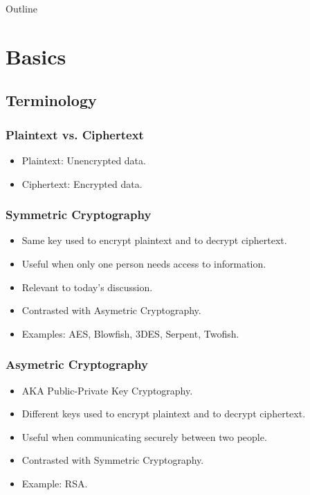 \documentclass[xcolor={dvipsnames,svgnames},hyperref=dvips]{beamer}
\title[Full-Disk Encryption]{}
\author{Wade Cline}
\date{04 March 2014}
\begin{document}
\begin{frame}
  \titlepage
\end{frame}

\begin{frame}{Outline}
  \tableofcontents
\end{frame}

\section{Basics}\label{section:basics}
	\subsection{Terminology}
	\begin{frame}
		\frametitle{Plaintext vs. Ciphertext}
		\begin{itemize}
		\item Plaintext: Unencrypted data.
		\item Ciphertext: Encrypted data.
		\end{itemize}
	\end{frame}

	\begin{frame}
		\frametitle{Symmetric Cryptography}
		\begin{itemize}
		\item Same key used to encrypt plaintext and to decrypt ciphertext. 
		\item Useful when only one person needs access to information.
		\item Relevant to today's discussion.
		\item Contrasted with Asymetric Cryptography.
		\item Examples: AES, Blowfish, 3DES, Serpent, Twofish.
		\end{itemize}
	\end{frame}

	\begin{frame}
		\frametitle{Asymetric Cryptography}
		\begin{itemize}
		\item AKA Public-Private Key Cryptography.
		\item Different keys used to encrypt plaintext and to decrypt ciphertext.
		\item Useful when communicating securely between two people.
		\item Contrasted with Symmetric Cryptography.
		\item Example: RSA.
		\end{itemize}
	\end{frame}
\end{document}
